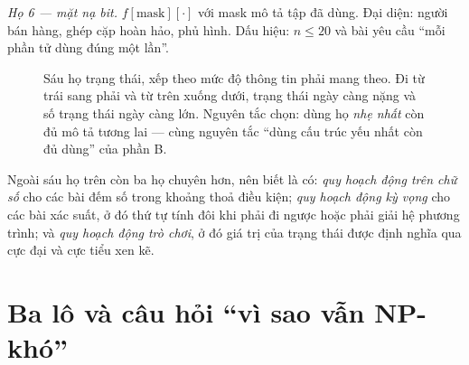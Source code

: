 \documentclass[../../algorithm.tex]{subfiles}
\begin{document}
\emph{Họ 6 --- mặt nạ bit.} \(f[\text{mask}][\cdot]\) với mask mô tả tập đã dùng. Đại diện: người bán hàng, ghép cặp hoàn hảo, phủ hình. Dấu hiệu: \(n \le 20\) và bài yêu cầu ``mỗi phần tử dùng đúng một lần''.

\begin{figure}[H]\centering
{}
\caption{Sáu họ trạng thái, xếp theo mức độ thông tin phải mang theo. Đi từ trái sang phải và từ trên xuống dưới, trạng thái ngày càng nặng và số trạng thái ngày càng lớn. Nguyên tắc chọn: dùng họ \emph{nhẹ nhất} còn đủ mô tả tương lai --- cùng nguyên tắc ``dùng cấu trúc yếu nhất còn đủ dùng'' của phần B.}
\label{fig:dp-families}
\end{figure}

Ngoài sáu họ trên còn ba họ chuyên hơn, nên biết là có: \emph{quy hoạch động trên chữ số} cho các bài đếm số trong khoảng thoả điều kiện; \emph{quy hoạch động kỳ vọng} cho các bài xác suất, ở đó thứ tự tính đôi khi phải đi ngược hoặc phải giải hệ phương trình; và \emph{quy hoạch động trò chơi}, ở đó giá trị của trạng thái được định nghĩa qua cực đại và cực tiểu xen kẽ.

\section{Ba lô và câu hỏi ``vì sao vẫn NP-khó''}
\end{document}
